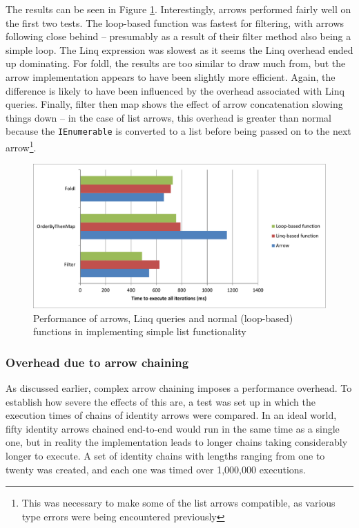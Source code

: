 \documentclass[12pt,twoside,notitlepage]{report}
\begin{document}
The results can be seen in Figure \ref{fig:list_function_performance}. Interestingly, arrows performed fairly well on the first two tests. The loop-based function was fastest for filtering, with arrows following close behind -- presumably as a result of their filter method also being a simple loop. The Linq expression was slowest as it seems the Linq overhead ended up dominating. For foldl, the results are too similar to draw much from, but the arrow implementation appears to have been slightly more efficient. Again, the difference is likely to have been influenced by the overhead associated with Linq queries. Finally, filter then map shows the effect of arrow concatenation slowing things down -- in the case of list arrows, this overhead is greater than normal because the \texttt{IEnumerable} is converted to a list before being passed on to the next arrow\footnote{This was necessary to make some of the list arrows compatible, as various type errors were being encountered previously}.

\begin{figure}[!ht]
  \centering
  \includegraphics[width=\textwidth]{fig/ListFunctionPerformanceChart.pdf}
  \caption{Performance of arrows, Linq queries and normal (loop-based) functions in implementing simple list functionality}
  \label{fig:list_function_performance}
\end{figure}

\subsubsection{Overhead due to arrow chaining}
\label{sec:arrow_chaining_overhead}

As discussed earlier, complex arrow chaining imposes a performance overhead. To establish how severe the effects of this are, a test was set up in which the execution times of chains of identity arrows were compared. In an ideal world, fifty identity arrows chained end-to-end would run in the same time as a single one, but in reality the implementation leads to longer chains taking considerably longer to execute. A set of identity chains with lengths ranging from one to twenty was created, and each one was timed over 1,000,000 executions.
\end{document}
